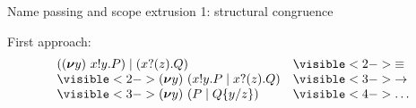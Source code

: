 \documentclass[aspectratio=169,hyperref={pdfpagelabels=false}]{beamer}
\begin{document}
\begin{frame}{Name passing and scope extrusion 1: structural congruence}

  First approach:\ \\

  \[
  \begin{array}{ll}
    \Ppar{(\Pres{y}{\Pout{x}{y}{P}})}{(\Pin{x}{z}{Q})} & \visible<2->{\equiv}\\
    \visible<2->{\Pres{y}{ (\Ppar{\Pout{x}{y}{P}}{\Pin{x}{z}{Q}})}} & \visible<3->{\rightarrow}\\
    \visible<3->{\Pres{y}{(\Ppar{P}{\subst{Q}{y}{z}})}} & \visible<4->{\dots}
  \end{array}
  \]
  \ \\ \ \\

      
\end{frame}

\newcommand{\hg}[1]{\colorbox{mygreen}{$\displaystyle #1$}}
\newcommand{\hr}[1]{\colorbox{myred}{$\displaystyle #1$}}
\end{document}

